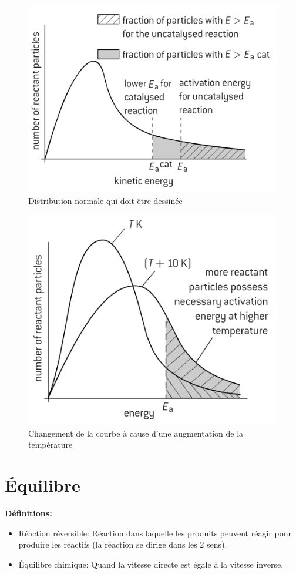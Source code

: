 \documentclass[french, a4paper, 12pt]{article}
\begin{document}
\begin{figure}[H]
\centering
\includegraphics[scale=0.8]{maxwell-boltzmann}
\caption{Distribution normale qui doit être dessinée}
\end{figure}

\begin{figure}[H]
\centering
\includegraphics[scale=0.8]{maxwell-boltzmann_temperature}
\caption{Changement de la courbe à cause d'une augmentation de la température}
\end{figure}
\pagebreak

\section{Équilibre}
\textbf{Définitions:}
\begin{itemize}
\item Réaction réversible: Réaction dans laquelle les produits peuvent réagir pour produire les réactifs (la réaction se dirige dans les 2 sens).
\item Équilibre chimique: Quand la vitesse directe est égale à la vitesse inverse.
\end{itemize}
\end{document}
